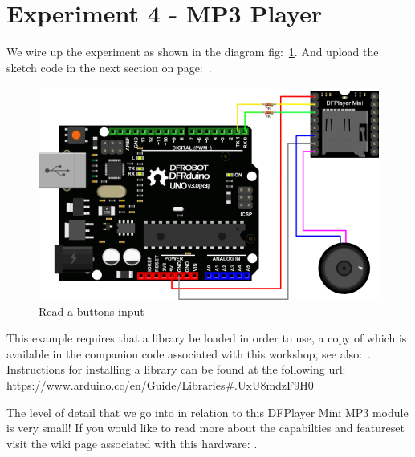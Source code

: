 \chapter*{Experiment 4 - MP3 Player}
We wire up the experiment as shown in the diagram fig:~\ref{fig:exp4_mp3}. And upload the sketch code in the next section on page:~\pageref{sketch:exp4}.

%
\begin{figure}[ht]
	\centering
	\includegraphics[width=12cm]{images/11}
	\caption{Read a buttons input \citep{dfrobot-15a}}
	\label{fig:exp4_mp3}
\end{figure}
%

This example requires that a library be loaded in order to use, a copy of which is available in the companion code associated with this workshop, see also:~\citep{dfrobot-15b}. Instructions for installing a library can be found at the following url: https://www.arduino.cc/en/Guide/Libraries\#.UxU8mdzF9H0 

The level of detail that we go into in relation to this DFPlayer Mini MP3 module is very small! If you would like to read more about the capabilties and featureset visit the wiki page associated with this hardware: \citep{dfrobot-15a}.

\newpage
